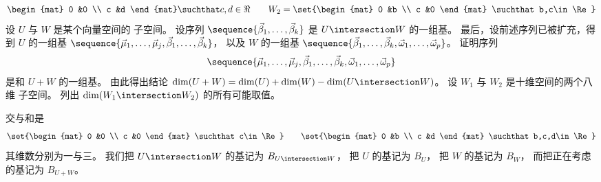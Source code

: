 \begin{exercises}
\begin{exparts}
\begin{equation*}
{\begin{mat}
                    0  &0  \\
                    c  &d
                  \end{mat} \suchthat c,d\in\Re  }
          \qquad
         W_2=\set{\begin{mat}
                    0  &b  \\
                    c  &0
                  \end{mat} \suchthat b,c\in\Re  }
       \end{equation*}
     \partsitem 设 \( U \) 与 \( W \) 是某个向量空间的
       子空间。
       设序列
       \( \sequence{\vec{\beta}_1,\dots,\vec{\beta}_k} \)
       是
       \( U\intersection W \) 的一组基。
       最后，设前述序列已被扩充，得到
       \( U \) 的一组基 \( \sequence{\vec{\mu}_1,\dots,\vec{\mu}_j,
       \vec{\beta}_1,\dots,\vec{\beta}_k} \)，
       以及 \( W \) 的一组基
       \( \sequence{\vec{\beta}_1,\dots,\vec{\beta}_k,
          \vec{\omega}_1,\dots,\vec{\omega}_p} \)。
       证明序列
       \begin{equation*}
         \sequence{\vec{\mu}_1,\dots,\vec{\mu}_j,
              \vec{\beta}_1,\dots,\vec{\beta}_k,
              \vec{\omega}_1,\dots,\vec{\omega}_p}
       \end{equation*}
       是和 \( U+W \) 的一组基。
      \partsitem 由此得出结论
          $\dim (U+W)=\dim(U)+\dim(W)-\dim(U\intersection W)$。
      \partsitem 设 \( W_1 \) 与 \( W_2 \) 是十维空间的两个八维
        子空间。
       列出 \( \dim(W_1\intersection W_2) \) 的所有可能取值。
    \end{exparts}
    \begin{answer}
      \begin{exparts}
        \partsitem 交与和是
          \begin{equation*}
             \set{\begin{mat}
                    0  &0  \\
                    c  &0
                  \end{mat} \suchthat c\in\Re  }
             \qquad
             \set{\begin{mat}
                    0  &b  \\
                    c  &d
                   \end{mat} \suchthat b,c,d\in\Re  }
          \end{equation*}
         其维数分别为一与三。
      \partsitem 我们把 $U\intersection W$ 的基记为
        $B_{U\intersection W}$，
        把 $U$ 的基记为 $B_U$，
        把 $W$ 的基记为 $B_W$，
        而把正在考虑的基记为 $B_{U+W}$。


\end{exparts}
\end{answer}
\end{exercises}
